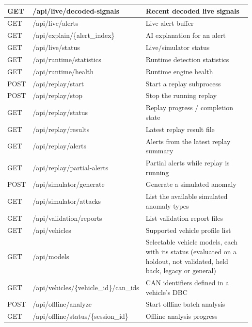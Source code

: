 \begin{longtable}{|p{1.4cm}|p{7.2cm}|p{6.0cm}|}
\hline
GET  & /api/live/decoded-signals               & Recent decoded live signals \\
\hline
GET  & /api/live/alerts                        & Live alert buffer \\
\hline
GET  & /api/explain/\{alert\_index\}           & AI explanation for an alert \\
\hline
GET  & /api/live/status                        & Live/simulator status \\
\hline
GET  & /api/runtime/statistics                 & Runtime detection statistics \\
\hline
GET  & /api/runtime/health                     & Runtime engine health \\
\hline
POST & /api/replay/start                       & Start a replay subprocess \\
\hline
POST & /api/replay/stop                        & Stop the running replay \\
\hline
GET  & /api/replay/status                      & Replay progress / completion state \\
\hline
GET  & /api/replay/results                     & Latest replay result file \\
\hline
GET  & /api/replay/alerts                       & Alerts from the latest replay summary \\
\hline
GET  & /api/replay/partial-alerts               & Partial alerts while replay is running \\
\hline
POST & /api/simulator/generate                 & Generate a simulated anomaly \\
\hline
GET  & /api/simulator/attacks                  & List the available simulated anomaly types \\
\hline
GET  & /api/validation/reports                 & List validation report files \\
\hline
GET  & /api/vehicles                           & Supported vehicle profile list \\
\hline
GET  & /api/models                             & Selectable vehicle models, each with its status (evaluated on a holdout, not validated, held back, legacy or general) \\
\hline
GET  & /api/vehicles/\{vehicle\_id\}/can\_ids   & CAN identifiers defined in a vehicle's DBC \\
\hline
POST & /api/offline/analyze                    & Start offline batch analysis \\
\hline
GET  & /api/offline/status/\{session\_id\}      & Offline analysis progress \\

\end{longtable}
